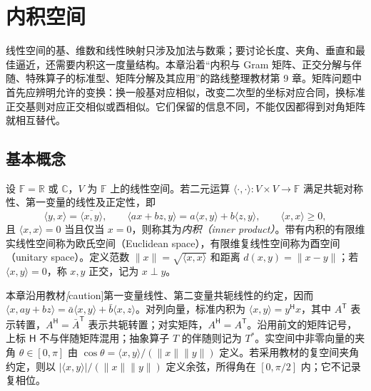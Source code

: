 \setcounter{chapter}{8} %
\chapter{内积空间}
\label{chap:xie-ip}

线性空间的基、维数和线性映射只涉及加法与数乘；要讨论长度、夹角、垂直和最佳逼近，还需要内积这一度量结构。本章沿着“内积与 Gram 矩阵、正交分解与伴随、特殊算子的标准型、矩阵分解及其应用”的路线整理教材第 9 章。矩阵问题中首先应辨明允许的变换：换一般基对应相似，改变二次型的坐标对应合同，换标准正交基则对应正交相似或酉相似。它们保留的信息不同，不能仅因都得到对角矩阵就相互替代。

\section{基本概念}
\label{sec:xie-ip-basics}

\begin{definition}
设 $\mathbb F=\mathbb R$ 或 $\mathbb C$，$V$ 为 $\mathbb F$ 上的线性空间。若二元运算 $\langle\cdot,\cdot\rangle:V\times V\to\mathbb F$ 满足共轭对称性、第一变量的线性及正定性，即
\[
\langle y,x\rangle=\overline{\langle x,y\rangle},\qquad
\langle ax+bz,y\rangle=a\langle x,y\rangle+b\langle z,y\rangle,
\qquad \langle x,x\rangle\geq0,
\]
且 $\langle x,x\rangle=0$ 当且仅当 $x=0$，则称其为\emph{内积（inner product）}。带有内积的有限维实线性空间称为欧氏空间（Euclidean space），有限维复线性空间称为酉空间（unitary space）。定义范数 $\|x\|=\sqrt{\langle x,x\rangle}$ 和距离 $d(x,y)=\|x-y\|$；若 $\langle x,y\rangle=0$，称 $x,y$ 正交，记为 $x\perp y$。
\end{definition}

本章沿用教材\emph[caution]{第一变量线性、第二变量共轭线性}的约定，因而 $\langle x,ay+bz\rangle=\bar a\langle x,y\rangle+\bar b\langle x,z\rangle$。对列向量，标准内积为 $\langle x,y\rangle=y^{\mathsf H}x$，其中 $A^{\mathsf T}$ 表示转置，$A^{\mathsf H}=\bar A^{\mathsf T}$ 表示共轭转置；对实矩阵，$A^{\mathsf H}=A^{\mathsf T}$。沿用前文的矩阵记号，上标 $\mathsf H$ 不与伴随矩阵混用；抽象算子 $T$ 的伴随则记为 $T^*$。实空间中非零向量的夹角 $\theta\in[0,\pi]$ 由 $\cos\theta=\langle x,y\rangle/(\|x\|\|y\|)$ 定义。若采用教材的复空间夹角约定，则以 $|\langle x,y\rangle|/(\|x\|\|y\|)$ 定义余弦，所得角在 $[0,\pi/2]$ 内；它不记录复相位。

